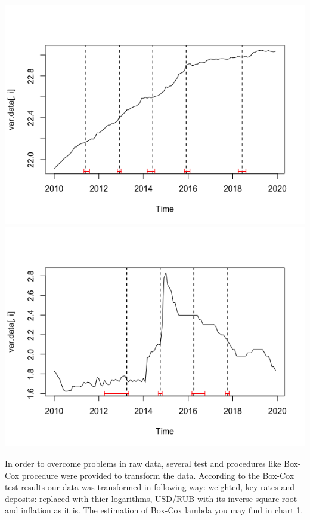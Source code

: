 \documentclass[
]{article}
\begin{document}
\includegraphics{Deposits.png} \includegraphics{Keynote.png}

In order to overcome problems in raw data, several test and procedures
like Box-Cox procedure were provided to transform the data. According to
the Box-Cox test results our data was transformed in following way:
weighted, key rates and deposits: replaced with thier logarithms,
USD/RUB with its inverse square root and inflation as it is. The
estimation of Box-Cox lambda you may find in chart 1.
\end{document}
